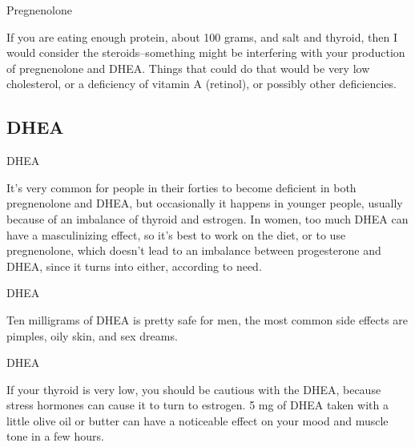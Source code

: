 \documentclass[11pt,oneside,openany,extrafontsizes]{memoir}
\begin{document}
\begin{standalonequote}{Pregnenolone}

    \begin{answer}
      If you are eating enough protein, about 100 grams, and salt and thyroid, then I would consider the steroids--something might be interfering with your production of pregnenolone and DHEA. Things that could do that would be very low cholesterol, or a deficiency of vitamin A (retinol), or possibly other deficiencies.
    \end{answer}
\end{standalonequote}

\subsection{DHEA}

\begin{standalonequote}{DHEA}

    \begin{answer}
        It's very common for people in their forties to become deficient in both pregnenolone and DHEA, but occasionally it happens in younger people, usually because of an imbalance of thyroid and estrogen. In women, too much DHEA can have a masculinizing effect, so it's best to work on the diet, or to use pregnenolone, which doesn't lead to an imbalance between progesterone and DHEA, since it turns into either, according to need.
    \end{answer}
\end{standalonequote}

\begin{standalonequote}{DHEA}

    \begin{answer}
        Ten milligrams of DHEA is pretty safe for men, the most common side effects are pimples, oily skin, and sex dreams.
    \end{answer}
\end{standalonequote}

\begin{standalonequote}{DHEA}

    \begin{answer}
        If your thyroid is very low, you should be cautious with the DHEA, because stress hormones can cause it to turn to estrogen. 5 mg of DHEA taken with a little olive oil or butter can have a noticeable effect on your mood and muscle tone in a few hours.
    \end{answer}
\end{standalonequote}
\end{document}
